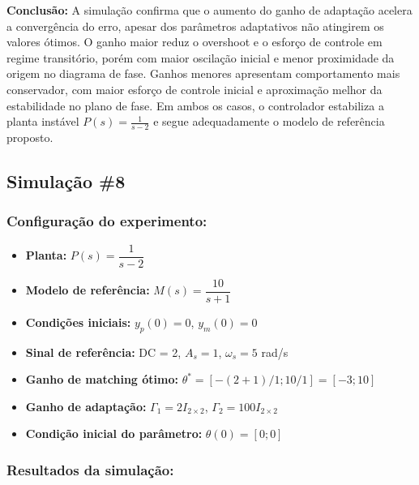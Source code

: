 \documentclass[10pt]{article}
\begin{document}
\textbf{Conclusão:} A simulação confirma que o aumento do ganho de adaptação acelera a convergência do erro, apesar dos parâmetros adaptativos não atingirem os valores ótimos. O ganho maior reduz o overshoot e o esforço de controle em regime transitório, porém com maior oscilação inicial e menor proximidade da origem no diagrama de fase. Ganhos menores apresentam comportamento mais conservador, com maior esforço de controle inicial e aproximação melhor da estabilidade no plano de fase. Em ambos os casos, o controlador estabiliza a planta instável $P(s) = \frac{1}{s - 2}$ e segue adequadamente o modelo de referência proposto.

\newpage

\subsection{Simulação \#8}
\subsubsection{Configuração do experimento:}
\begin{itemize}
\item \textbf{Planta:} $P(s) = \dfrac{1}{s - 2}$
\item \textbf{Modelo de referência:} $M(s) = \dfrac{10}{s + 1}$
\item \textbf{Condições iniciais:} $y_p(0)=0$, $y_m(0)=0$
\item \textbf{Sinal de referência:} DC = 2, $A_s=1$, $\omega_s=5$ rad/s
\item \textbf{Ganho de matching ótimo:} $\theta^* = [-(2+1)/1;10/1] = [-3;10]$
\item \textbf{Ganho de adaptação:} $\Gamma_1 = 2I_{2\times2}$, $\Gamma_2 = 100I_{2\times2}$
\item \textbf{Condição inicial do parâmetro:} $\theta(0) = [0;0]$
\end{itemize}

\subsubsection{Resultados da simulação:}
\end{document}
